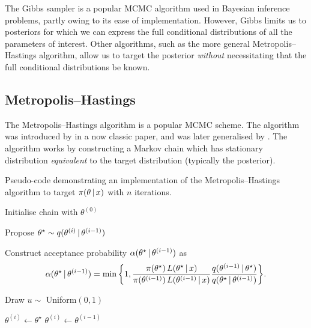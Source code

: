 The Gibbs sampler is a popular MCMC algorithm used in Bayesian inference
problems, partly owing to its ease of implementation. However, Gibbs limits us
to posteriors for which we can express the full conditional distributions of
all the parameters of interest. Other algorithms, such as the more general
Metropolis--Hastings algorithm, allow us to target the posterior \emph{without}
necessitating that the full conditional distributions be known.

\subsection{Metropolis--Hastings}
\label{ssec:metropolis_hastings}

The Metropolis--Hastings algorithm is a popular MCMC scheme. The algorithm was
introduced by \textcite{metropolis53} in a now classic paper, and was later
generalised by \textcite{hastings70}. The algorithm works by constructing a
Markov chain which has stationary distribution \emph{equivalent} to the target
distribution (typically the posterior).

\begin{algorithm}
  \caption{Pseudo-code demonstrating an implementation of the
    Metropolis--Hastings algorithm to target $\pi(\theta \,|\, x)$ with $n$
    iterations.}
  \label{alg:metropolis_hastings}

  \begin{algorithmic}[1]
    \State Initialise chain with $\theta^{(0)}$

      \State Propose ${\theta}^\star \sim 
        q(\theta^{(i)} \,|\, \theta^{(i-1)})$

      \State Construct acceptance probability
        $\alpha(\theta^\star \,|\, \theta^{(i-1)})$ as
      \begin{equation*}
        \alpha(\theta^\star \given \theta^{(i-1)}) =
        \min
        \bigg\{1,
          \frac{\pi(\theta^\star) \, L(\theta^\star \given x)}%
            {\pi(\theta^{(i-1)}) \, L(\theta^{(i-1)} \given x)}
          \frac{q(\theta^{(i-1)} \given \theta^\star)}%
            {q(\theta^\star \given \theta^{(i-1)})}
        \bigg\}.
      \end{equation*}

      \State Draw $u \sim$ Uniform$(0, 1)$

        \State {}
        \State $\theta^{(i)} \leftarrow \theta^\star$
      \Else
        \State {}
        \State $\theta^{(i)} \leftarrow \theta^{(i-1)}$
      \EndIf

    \EndFor
  \end{algorithmic}
\end{algorithm}

